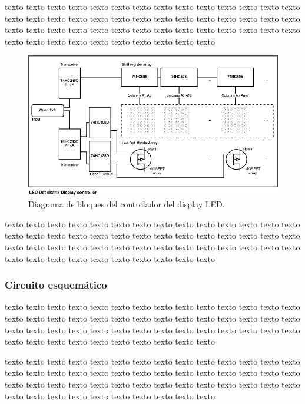 \documentclass[
11pt, %
]{charter}
\begin{document}
texto texto texto texto texto texto texto texto texto texto texto texto texto texto texto texto texto texto texto texto texto texto texto texto texto texto texto texto texto texto texto texto texto texto texto texto texto texto texto texto texto texto texto texto texto texto texto texto texto texto texto texto 


\begin{figure}[htpb]
\centering 
\includegraphics[width=1\textwidth]{./Pics/blockDiagram.png}
\caption{Diagrama de bloques del controlador del display LED.}
\label{fig:blockDiagram LED display}
\end{figure}

texto texto texto texto texto texto texto texto texto texto texto texto texto texto texto texto texto texto texto texto texto texto texto texto texto texto texto texto texto texto texto texto texto texto texto texto texto texto texto texto texto texto texto texto texto texto texto texto texto texto texto texto 

\subsubsection{Circuito esquemático}

texto texto texto texto texto texto texto texto texto texto texto texto texto texto texto texto texto texto texto texto texto texto texto texto texto texto texto texto texto texto texto texto texto texto texto texto texto texto texto texto texto texto texto texto texto texto texto texto texto texto texto texto 


	

texto texto texto texto texto texto texto texto texto texto texto texto texto texto texto texto texto texto texto texto texto texto texto texto texto texto texto texto texto texto texto texto texto texto texto texto texto texto texto texto texto texto texto texto texto texto texto texto texto texto texto texto 
\end{document}
